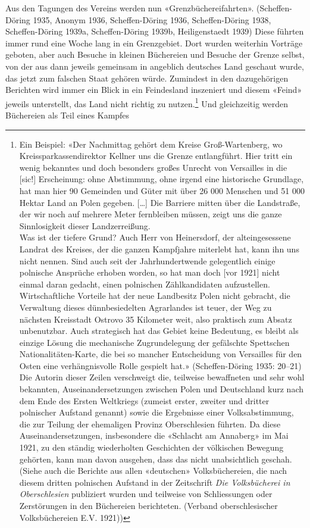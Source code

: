 \documentclass[a4paper,
fontsize=11pt,
oneside,
numbers=noperiodatend,
parskip=half-,
bibliography=totoc,
final
]{scrartcl}
\begin{document}
Aus den Tagungen des Vereins werden nun «Grenzbüchereifahrten».
(Scheffen-Döring 1935, Anonym 1936, Scheffen-Döring 1936,
Scheffen-Döring 1938, Scheffen-Döring 1939a, Scheffen-Döring 1939b,
Heiligenstaedt 1939) Diese führten immer rund eine Woche lang in ein
Grenzgebiet. Dort wurden weiterhin Vorträge geboten, aber auch Besuche
in kleinen Büchereien und Besuche der Grenze selbst, von der aus dann
jeweils gemeinsam in angeblich deutsches Land geschaut wurde, das jetzt
zum falschen Staat gehören würde. Zumindest in den dazugehörigen
Berichten wird immer ein Blick in ein Feindesland inszeniert und diesem
«Feind» jeweils unterstellt, das Land nicht richtig zu
nutzen.\footnote{Ein Beispiel: «Der Nachmittag gehört dem Kreise
  Groß-Wartenberg, wo Kreissparkassendirektor Kellner uns die Grenze
  entlangführt. Hier tritt ein wenig bekanntes und doch besonders großes
  Unrecht von Versailles in die {[}sic!{]} Erscheinung: ohne Abstimmung,
  ohne irgend eine historische Grundlage, hat man hier 90 Gemeinden und
  Güter mit über 26 000 Menschen und 51 000 Hektar Land an Polen
  gegeben. {[}\ldots{]} Die Barriere mitten über die Landstraße, der wir
  noch auf mehrere Meter fernbleiben müssen, zeigt uns die ganze
  Sinnlosigkeit dieser Landzerreißung.\\
  Was ist der tiefere Grund? Auch Herr von Heinersdorf, der
  alteingesessene Landrat des Kreises, der die ganzen Kampfjahre
  miterlebt hat, kann ihn uns nicht nennen. Sind auch seit der
  Jahrhundertwende gelegentlich einige polnische Ansprüche erhoben
  worden, so hat man doch {[}vor 1921{]} nicht einmal daran gedacht,
  einen polnischen Zählkandidaten aufzustellen. Wirtschaftliche Vorteile
  hat der neue Landbesitz Polen nicht gebracht, die Verwaltung dieses
  dünnbesiedelten Agrarlandes ist teuer, der Weg zu nächsten Kreisstadt
  Ostrovo 35 Kilometer weit, also praktisch zum Absatz unbenutzbar. Auch
  strategisch hat das Gebiet keine Bedeutung, es bleibt als einzige
  Lösung die mechanische Zugrundelegung der gefälschte Spettschen
  Nationalitäten-Karte, die bei so mancher Entscheidung von Versailles
  für den Osten eine verhängnisvolle Rolle gespielt hat.»
  (Scheffen-Döring 1935: 20--21)\\
  Die Autorin dieser Zeilen verschweigt die, teilweise bewaffneten und
  sehr wohl bekannten, Auseinandersetzungen zwischen Polen und
  Deutschland kurz nach dem Ende des Ersten Weltkriegs (zumeist erster,
  zweiter und dritter polnischer Aufstand genannt) sowie die Ergebnisse
  einer Volksabstimmung, die zur Teilung der ehemaligen Provinz
  Oberschlesien führten. Da diese Auseinandersetzungen, insbesondere die
  «Schlacht am Annaberg» im Mai 1921, zu den ständig wiederholten
  Geschichten der völkischen Bewegung gehörten, kann man davon ausgehen,
  dass das nicht unabsichtlich geschah. (Siehe auch die Berichte aus
  allen «deutschen» Volksbüchereien, die nach diesem dritten polnischen
  Aufstand in der Zeitschrift \emph{Die Volksbücherei in Oberschlesien}
  publiziert wurden und teilweise von Schliessungen oder Zerstörungen in
  den Büchereien berichteten. (Verband oberschlesischer Volksbüchereien
  E.V. 1921))} Und gleichzeitig werden Büchereien als Teil eines Kampfes
\end{document}
